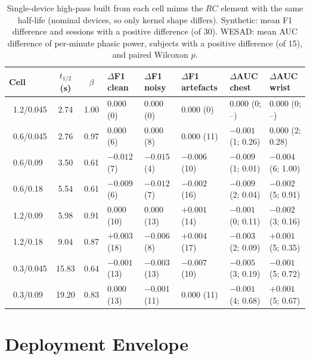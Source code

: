 \begin{table}[t]
  \centering
  \caption[Measured kernel versus $RC$ element at the same half-life]{Single-device high-pass built from each cell minus the $RC$ element with the same half-life (nominal devices, so only kernel shape differs). Synthetic: mean F1 difference and sessions with a positive difference (of 30). WESAD: mean AUC difference of per-minute phasic power, subjects with a positive difference (of 15), and paired Wilcoxon $p$.}
  \label{tab:ch5_device_vs_rc}
  \scriptsize
  \setlength{\tabcolsep}{3pt}
  \begin{tabularx}{\linewidth}{@{}l c c >{\centering\arraybackslash}X >{\centering\arraybackslash}X >{\centering\arraybackslash}X >{\centering\arraybackslash}X >{\centering\arraybackslash}X@{}}
    \toprule
    Cell & $t_{1/2}$ (s) & $\beta$ & $\Delta$F1 clean & $\Delta$F1 noisy & $\Delta$F1 artefacts & $\Delta$AUC chest & $\Delta$AUC wrist \\
    \midrule
    \PEO{}~1.2/0.045 & 2.74 & 1.00 & $0.000$ (0) & $0.000$ (0) & $0.000$ (0) & $0.000$ (0; --) & $0.000$ (0; --) \\
    \PEO{}~0.6/0.045 & 2.76 & 0.97 & $0.000$ (6) & $0.000$ (8) & $0.000$ (11) & $-0.001$ (1; 0.26) & $0.000$ (2; 0.28) \\
    \PEO{}~0.6/0.09 & 3.50 & 0.61 & $-0.012$ (7) & $-0.015$ (4) & $-0.006$ (10) & $-0.009$ (1; 0.01) & $-0.004$ (6; 1.00) \\
    \PEO{}~0.6/0.18 & 5.54 & 0.61 & $-0.009$ (6) & $-0.012$ (7) & $-0.002$ (16) & $-0.009$ (2; 0.04) & $-0.002$ (5; 0.91) \\
    \PEO{}~1.2/0.09 & 5.98 & 0.91 & $0.000$ (10) & $0.000$ (13) & $+0.001$ (14) & $-0.001$ (0; 0.11) & $-0.002$ (3; 0.16) \\
    \PEO{}~1.2/0.18 & 9.04 & 0.87 & $+0.003$ (18) & $-0.006$ (8) & $+0.004$ (17) & $-0.003$ (2; 0.09) & $+0.001$ (5; 0.35) \\
    \PEO{}~0.3/0.045 & 15.83 & 0.64 & $-0.001$ (13) & $-0.003$ (13) & $-0.007$ (10) & $-0.005$ (3; 0.19) & $-0.001$ (5; 0.72) \\
    \PEO{}~0.3/0.09 & 19.20 & 0.83 & $0.000$ (13) & $-0.001$ (11) & $0.000$ (11) & $-0.001$ (4; 0.68) & $+0.001$ (5; 0.67) \\
    \bottomrule
  \end{tabularx}
\end{table}

\section{Deployment Envelope}\label{app:ch5_deploy}


